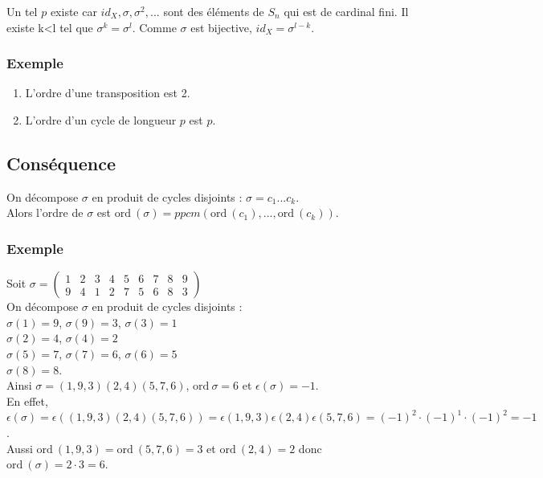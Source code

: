 \documentclass[a4paper,10pt]{book} %
\newcommand{\ord}{\mathrm{ord}~} %
\begin{document}
Un tel $p$ existe car $id_X,\sigma,\sigma^2,...$ sont des éléments de $S_n$ qui est de cardinal fini. Il existe k<l tel que $\sigma^k=\sigma^l$. Comme $\sigma$ est bijective, $id_X=\sigma^{l-k}$.

\subsubsection{Exemple}
\begin{enumerate}
\item L'ordre d'une transposition est 2.
\item L'ordre d'un cycle de longueur $p$ est $p$.
\end{enumerate}

\newpage

\subsection{Conséquence}
On décompose $\sigma$ en produit de cycles disjoints : $\sigma=c_1...c_k$.\\

Alors l'ordre de $\sigma$ est $\ord(\sigma)=ppcm(\ord(c_1),...,\ord (c_k))$.

\subsubsection{Exemple}
Soit $\sigma=\begin{pmatrix}
1&2&3&4&5&6&7&8&9\\
9&4&1&2&7&5&6&8&3\end{pmatrix}$\\

On décompose $\sigma$ en produit de cycles disjoints :\\
$\sigma(1)=9$, $\sigma(9)=3$, $\sigma(3)=1$\\
$\sigma(2)=4$, $\sigma(4)=2$\\
$\sigma(5)=7$, $\sigma(7)=6$, $\sigma(6)=5$\\
$\sigma(8)=8$.\\

Ainsi $\sigma=(1,9,3)(2,4)(5,7,6)$, $\ord\sigma=6$ et $\epsilon(\sigma)=-1$.\\

En effet, $\epsilon(\sigma)=\epsilon((1,9,3)(2,4)(5,7,6))=\epsilon(1,9,3)\epsilon(2,4)\epsilon(5,7,6)=(-1)^2\cdot (-1)^1\cdot (-1)^2=-1$.\\

Aussi $\ord(1,9,3)=\ord(5,7,6)=3$ et $\ord(2,4)=2$ donc $\ord(\sigma)=2\cdot 3=6$.
\end{document}
